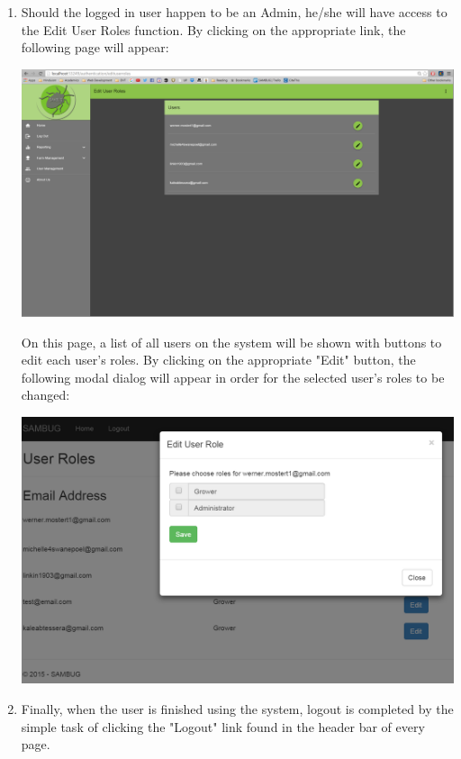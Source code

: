 \documentclass[11pt,a4paper,titlepage]{article}
\begin{document}
\begin{enumerate}
\item Should the logged in user happen to be an Admin, he/she will have access to the Edit User Roles function. By clicking on the appropriate link, the following page will appear: 
	\begin{center}
		\includegraphics[width=\linewidth]{edituserroles.png}
	\end{center}
	On this page, a list of all users on the system will be shown with buttons to edit each user's roles. By clicking on the appropriate "Edit" button, the following modal dialog will appear in order for the selected user's roles to be changed:
		\begin{center}
			\includegraphics[scale=0.3]{edituserrole.png} %
		\end{center}
\item Finally, when the user is finished using the system, logout is completed by the simple task of clicking the "Logout" link found in the header bar of every page.
	\end{enumerate}
\end{document}

